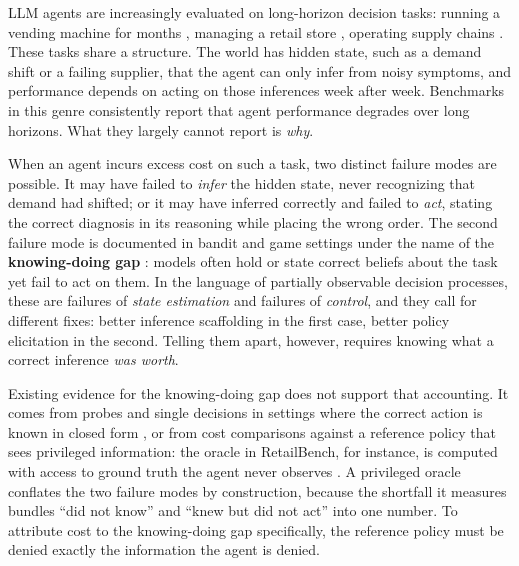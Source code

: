 \documentclass{article}
\begin{document}
LLM agents are increasingly evaluated on long-horizon decision tasks: running a
vending machine for months \citep{vendingbench2025}, managing a retail
store \citep{retailbench2026}, operating supply chains
\citep{aimbench2025,invagent2024}. These tasks share a
structure. The world has hidden state, such as a demand shift or a failing
supplier, that the agent can only infer from noisy symptoms, and performance
depends on acting on those inferences week after week. Benchmarks in this genre
consistently report that agent performance degrades over long horizons. What
they largely cannot report is \emph{why}.

When an agent incurs excess cost on such a task, two distinct failure modes
are possible. It may have failed to \emph{infer} the hidden state, never
recognizing that demand had shifted; or it may have inferred correctly and
failed to \emph{act}, stating the correct diagnosis in its reasoning while
placing the wrong order.
The second failure mode is documented in bandit and game settings under the
name of the \textbf{knowing-doing gap}
\citep{schmied2025greedy,sobotka2026broken}: models often hold or state
correct beliefs about the task yet fail to act on them.
In the language of partially observable decision processes, these are
failures of \emph{state estimation} and failures of \emph{control}, and
they call for different fixes: better inference scaffolding in the first
case, better policy elicitation in the second. Telling them apart,
however, requires knowing what a correct inference \emph{was worth}.

Existing evidence for the knowing-doing gap does not support that accounting.
It comes from probes and single decisions in settings where the correct
action is known in closed form \citep{sobotka2026broken,schmied2025greedy},
or from cost comparisons against a reference policy that sees privileged
information: the oracle in RetailBench, for instance, is computed with
access to ground truth the agent never observes \citep{retailbench2026}. A
privileged oracle conflates the two failure modes by construction, because the
shortfall it measures bundles ``did not know'' and ``knew but did not act''
into one number. To attribute cost to the knowing-doing gap specifically, the
reference policy must be denied exactly the information the agent is denied.
\end{document}
